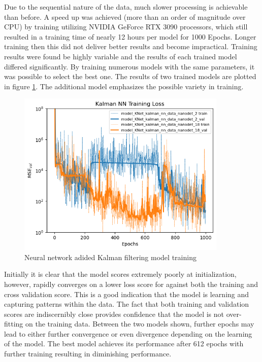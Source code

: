 \documentclass[a4paper,twoside,12pt]{report}
\begin{document}
Due to the sequential nature of the data, much slower processing is achievable than before. A speed up was achieved (more than an order of magnitude over CPU) by training utilizing NVIDIA GeForce RTX 3090 processors, which still resulted in a training time of nearly 12 hours per model for 1000 Epochs. Longer training then this did not deliver better results and become impractical. Training results were found be highly variable and the results of each trained model differed significantly. By training numerous models with the same parameters, it was possible to select the best one. The results of two trained models are plotted in figure \ref{fig:RNNtrain}. The additional model emphasizes the possible variety in training.

\begin{figure}[h!]
\begin{center}
\includegraphics[width=10cm]{images/knet_train.png}
\caption{Neural network adided Kalman filtering model training}
\label{fig:RNNtrain}
\end{center}
\end{figure}

Initially it is clear that the model scores extremely poorly at initialization, however, rapidly converges on a lower loss score for against both the training and cross validation score. This is a good indication that the model is learning and capturing patterns within the data. The fact that both training and validation scores are indiscernibly close provides confidence that the model is not over-fitting on the training data. Between the two models shown, further epochs may lead to either further convergence or even divergence depending on the learning of the model. The best model achieves its performance after 612 epochs with further training resulting in diminishing performance.
\end{document}
